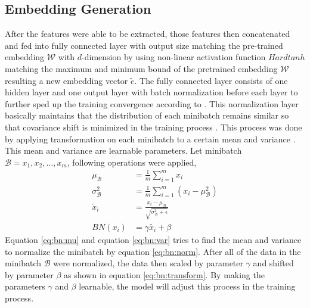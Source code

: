     \subsection{Embedding Generation}
        After the features were able to be extracted, those features
        then concatenated and fed into fully connected layer with
        output size matching the pre-trained embedding $\mathcal{W}$
        with $d$-dimension by using non-linear activation function
        $Hardtanh$ matching the maximum and minimum bound of the
        pretrained embedding $\mathcal{W}$ resulting a new embedding
        vector $\tilde{e}$. The fully connected layer consists of one
        hidden layer and one output layer with batch normalization
        before each layer to further sped up the training convergence
        according to \cite{batchnorm:DBLP:journals/corr/IoffeS15}.
        This normalization layer basically maintains that the
        distribution of each minibatch remains similar so that
        covariance shift is minimized in the training process
        \citep{batchnorm:DBLP:journals/corr/IoffeS15}. This process
        was done by applying transformation on each minibatch to a
        certain mean and variance
        \citep{batchnorm:DBLP:journals/corr/IoffeS15}. This mean and
        variance are learnable parameters. Let minibatch $\mathcal{B}
        = {x_1, x_2, \dots, x_m}$, following operations were applied,
        \begin{align}
            \label{eq:bn:mu}
            \mu_{\mathcal{B}} &= \frac{1}{m} \sum_{i=1}^m x_i\\
            \label{eq:bn:var}
            \sigma^2_{\mathcal{B}} &= \frac{1}{m} \sum_{i=1}^m \left(x_i - \mu_{\mathcal{B}}^2\right)\\
            \label{eq:bn:norm}            
            \tilde{x}_i &= \frac{x_i - \mu_{\mathcal{B}}}{\sqrt{\sigma^2_{\mathcal{B}} + \epsilon}}\\
            \label{eq:bn:transform}            
            BN(x_i) &= \gamma\tilde{x_i} + \beta
        \end{align}
        Equation \ref{eq:bn:mu} and equation \ref{eq:bn:var} tries to
        find the mean and variance to normalize the minibatch by
        equation \ref{eq:bn:norm}. After all of the data in the
        minibatch $\mathcal{B}$ were normalized, the data then scaled
        by parameter $\gamma$ and shifted by parameter $\beta$ as
        shown in equation \ref{eq:bn:transform}. By making the
        parameters $\gamma$ and $\beta$ learnable, the model will
        adjust this process in the training process.


